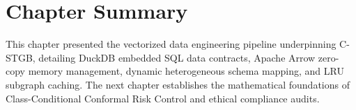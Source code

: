 \FloatBarrier
\section{Chapter Summary}
This chapter presented the vectorized data engineering pipeline underpinning C-STGB, detailing DuckDB embedded SQL data contracts, Apache Arrow zero-copy memory management, dynamic heterogeneous schema mapping, and LRU subgraph caching. The next chapter establishes the mathematical foundations of Class-Conditional Conformal Risk Control and ethical compliance audits.
